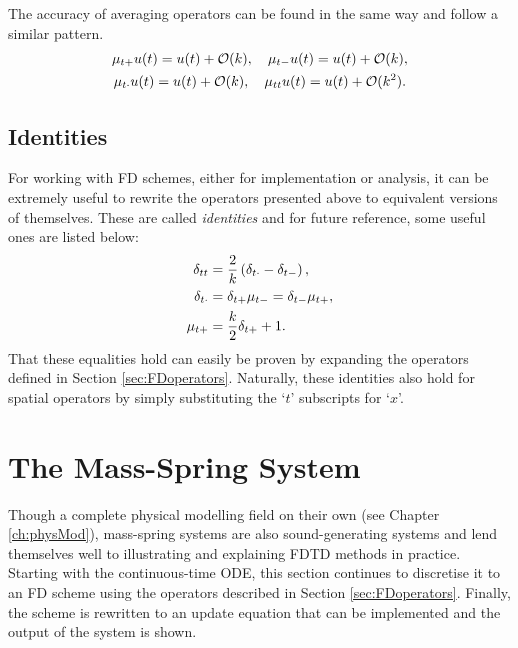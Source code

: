 The accuracy of averaging operators can be found in the same way and follow a similar pattern. 
\begin{equation}
    \begin{gathered}
    \mu_{t+} u(t) = u(t) + \mathcal{O}(k),\quad \mu_{t-} u(t)= u(t) + \mathcal{O}(k),\\
    \mu_{t\cdot} u(t)= u(t) + \mathcal{O}(k), \quad \mu_{tt} u(t)= u(t) + \mathcal{O}(k^2).
    \end{gathered}
\end{equation}

\subsection{Identities}
For working with FD schemes, either for implementation or analysis, it can be extremely useful to rewrite the operators presented above to equivalent versions of themselves. These are called \textit{identities} and for future reference, some useful ones are listed below:
\begin{subequations}
    \begin{align}
        \delta_{tt} &= \frac{2}{k}\left(\delta_{t\cdot}- \delta_{t-}\right),\label{eq:identity1}\\
        \delta_{t\cdot} &= \delta_{t+}\mu_{t-} = \delta_{t-}\mu_{t+}\label{eq:identity2},\\
        \mu_{t+} &= \frac{k}{2}\delta_{t+} + 1\label{eq:identity3}.
    \end{align}
\end{subequations}
That these equalities hold can easily be proven by expanding the operators defined in Section \ref{sec:FDoperators}. Naturally, these identities also hold for spatial operators by simply substituting the `$t$' subscripts for `$x$'. 

\section{%
The Mass-Spring System}\label{sec:massSpringSystem}
Though a complete physical modelling field on their own (see Chapter \ref{ch:physMod}), mass-spring systems are also sound-generating systems and lend themselves well to illustrating and explaining FDTD methods in practice. Starting with the continuous-time ODE, this section continues to discretise it to an FD scheme using the operators described in Section \ref{sec:FDoperators}. Finally, the scheme is rewritten to an update equation that can be implemented and the output of the system is shown. 

